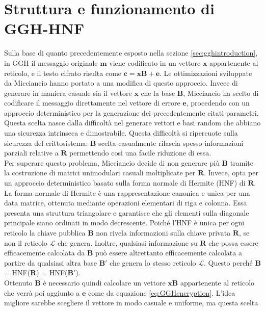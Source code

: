 \section{Struttura e funzionamento di GGH-HNF}
Sulla base di quanto precedentemente esposto nella sezione \ref{sec:gghintroduction}, in GGH
il messaggio originale $\mathbf{m}$ viene codificato in un vettore $\mathbf{x}$ 
appartenente al reticolo, e il testo cifrato risulta come 
$\mathbf{c} = \mathbf{x}\mathbf{B} + \mathbf{e}$.
Le ottimizzazioni sviluppate da Micciancio hanno portato a una modifica di questo approccio. 
Invece di generare in maniera casuale sia il vettore $\mathbf{x}$ che la base $\mathbf{B}$, 
Micciancio ha scelto di codificare il messaggio direttamente nel vettore di errore $\mathbf{e}$, 
procedendo con un approccio deterministico per la generazione dei precedentemente citati parametri.
Questa scelta nasce dalla difficoltà nel generare vettori e basi random che abbiano una 
sicurezza intrinseca e dimostrabile. Questa difficoltà si ripercuote sulla sicurezza del 
crittosistema: $\mathbf{B}$ scelta casualmente rilascia spesso informazioni parziali
relative a $\mathbf{R}$ permettendo così una facile riduzione di essa. \\
Per superare questo problema, Micciancio decide di non generare più $\mathbf{B}$ tramite 
la costruzione di matrici unimodulari casuali moltiplicate per $\mathbf{R}$. 
Invece, opta per un approccio deterministico basato sulla forma normale di Hermite (HNF)
di $\mathbf{R}$. La forma normale di Hermite è una rappresentazione canonica e unica per 
una data matrice, ottenuta mediante operazioni elementari di riga e colonna. 
Essa presenta una struttura triangolare e garantisce che gli elementi sulla diagonale principale 
siano ordinati in modo decrescente.
Poiché l'HNF è unica per ogni reticolo la chiave pubblica $\mathbf{B}$ non rivela informazioni 
sulla chiave privata $\mathbf{R}$, se non il reticolo $\mathcal{L}$ che genera.
Inoltre, qualsiasi informazione su $\mathbf{R}$ che possa essere efficacemente calcolata 
da $\mathbf{B}$ può 
essere altrettanto efficacemente calcolata a partire da qualsiasi altra base $\mathbf{B}'$ 
che genera lo stesso reticolo $\mathcal{L}$. Questo perché 
$\mathbf{B}$ = HNF($\mathbf{R}$) = HNF($\mathbf{B}'$). \\
Ottenuto $\mathbf{B}$ è necessario quindi calcolare un vettore
$\mathbf{x}\mathbf{B}$ appartenente al reticolo che verrà poi aggiunto a $\mathbf{e}$ come
da equazione \ref{eq:GGHencryption}.  
L'idea migliore sarebbe scegliere il vettore in modo casuale e uniforme, ma questa scelta 
